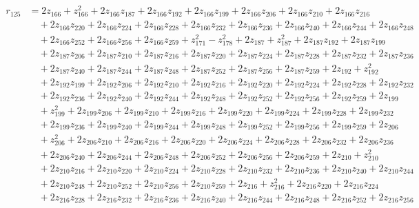 \begin{align*}
r_{125} &= 2z_{166} + z_{166}^{2} + 2z_{166}z_{187} + 2z_{166}z_{192} + 2z_{166}z_{199} + 2z_{166}z_{206} + 2z_{166}z_{210} + 2z_{166}z_{216} \\
&\quad  + 2z_{166}z_{220} + 2z_{166}z_{224} + 2z_{166}z_{228} + 2z_{166}z_{232} + 2z_{166}z_{236} + 2z_{166}z_{240} + 2z_{166}z_{244} + 2z_{166}z_{248} \\
&\quad  + 2z_{166}z_{252} + 2z_{166}z_{256} + 2z_{166}z_{259} + z_{171}^{2} - z_{178}^{2} + 2z_{187} + z_{187}^{2} + 2z_{187}z_{192} + 2z_{187}z_{199} \\
&\quad  + 2z_{187}z_{206} + 2z_{187}z_{210} + 2z_{187}z_{216} + 2z_{187}z_{220} + 2z_{187}z_{224} + 2z_{187}z_{228} + 2z_{187}z_{232} + 2z_{187}z_{236} \\
&\quad  + 2z_{187}z_{240} + 2z_{187}z_{244} + 2z_{187}z_{248} + 2z_{187}z_{252} + 2z_{187}z_{256} + 2z_{187}z_{259} + 2z_{192} + z_{192}^{2} \\
&\quad  + 2z_{192}z_{199} + 2z_{192}z_{206} + 2z_{192}z_{210} + 2z_{192}z_{216} + 2z_{192}z_{220} + 2z_{192}z_{224} + 2z_{192}z_{228} + 2z_{192}z_{232} \\
&\quad  + 2z_{192}z_{236} + 2z_{192}z_{240} + 2z_{192}z_{244} + 2z_{192}z_{248} + 2z_{192}z_{252} + 2z_{192}z_{256} + 2z_{192}z_{259} + 2z_{199} \\
&\quad  + z_{199}^{2} + 2z_{199}z_{206} + 2z_{199}z_{210} + 2z_{199}z_{216} + 2z_{199}z_{220} + 2z_{199}z_{224} + 2z_{199}z_{228} + 2z_{199}z_{232} \\
&\quad  + 2z_{199}z_{236} + 2z_{199}z_{240} + 2z_{199}z_{244} + 2z_{199}z_{248} + 2z_{199}z_{252} + 2z_{199}z_{256} + 2z_{199}z_{259} + 2z_{206} \\
&\quad  + z_{206}^{2} + 2z_{206}z_{210} + 2z_{206}z_{216} + 2z_{206}z_{220} + 2z_{206}z_{224} + 2z_{206}z_{228} + 2z_{206}z_{232} + 2z_{206}z_{236} \\
&\quad  + 2z_{206}z_{240} + 2z_{206}z_{244} + 2z_{206}z_{248} + 2z_{206}z_{252} + 2z_{206}z_{256} + 2z_{206}z_{259} + 2z_{210} + z_{210}^{2} \\
&\quad  + 2z_{210}z_{216} + 2z_{210}z_{220} + 2z_{210}z_{224} + 2z_{210}z_{228} + 2z_{210}z_{232} + 2z_{210}z_{236} + 2z_{210}z_{240} + 2z_{210}z_{244} \\
&\quad  + 2z_{210}z_{248} + 2z_{210}z_{252} + 2z_{210}z_{256} + 2z_{210}z_{259} + 2z_{216} + z_{216}^{2} + 2z_{216}z_{220} + 2z_{216}z_{224} \\
&\quad  + 2z_{216}z_{228} + 2z_{216}z_{232} + 2z_{216}z_{236} + 2z_{216}z_{240} + 2z_{216}z_{244} + 2z_{216}z_{248} + 2z_{216}z_{252} + 2z_{216}z_{256} \\

\end{align*}

